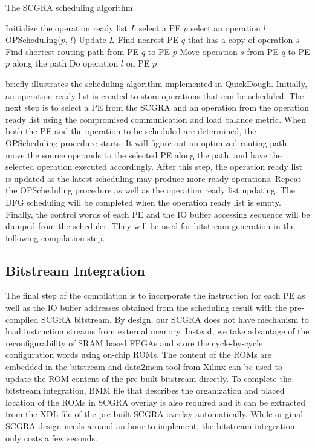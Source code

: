 \begin{algorithm}
\caption{The SCGRA scheduling algorithm.}
\label{alg:scheduling}
\begin{algorithmic}
\STATE Initialize the operation ready list $L$
\STATE select a PE $p$
\STATE select an operation $l$
\STATE OPScheduling($p$, $l$)
\STATE Update $L$
\ENDWHILE
\ENDPROCEDURE
\STATE
{}
\STATE Find nearest PE $q$ that has a copy of operation $s$
\STATE Find shortest routing path from PE $q$ to PE $p$
\STATE Move operation $s$ from PE $q$ to PE $p$ along the path
\ENDFOR
\STATE Do operation $l$ on PE $p$
\ENDPROCEDURE

\end{algorithmic}
\end{algorithm}

 briefly illustrates the scheduling algorithm implemented in QuickDough. Initially, an operation ready list is created to store operations that can be scheduled. The next step is to select a PE from the SCGRA and an operation from the operation ready list using the compromised communication and load balance metric. When both the PE and the operation to be scheduled are determined, the OPScheduling procedure starts. It will figure out an optimized routing path, move the source operands to the selected PE along the path, and have the selected operation executed accordingly. After this step, the operation ready list is updated as the latest scheduling may produce more ready operations. Repeat the OPScheduling procedure as well as the operation ready list updating. The DFG scheduling will be completed when the operation ready list is empty. Finally, the control words of each PE and the IO buffer accessing sequence will be dumped from the scheduler. They will be used for bitstream generation in the following compilation step. 

\subsection{Bitstream Integration}
The final step of the compilation is to incorporate the instruction for each PE as well as the IO buffer addresses obtained from the scheduling result with the pre-compiled SCGRA bitstream. By design, our SCGRA does not have mechanism to load instruction streams from external memory. Instead, we take advantage of the reconfigurability of SRAM based FPGAs and store the cycle-by-cycle configuration words using on-chip ROMs. The content of the ROMs are embedded in the bitstream and data2mem tool from Xilinx \cite{data2mem} can be used to update the ROM content of the pre-built bitstream directly. To complete the bitstream integration, BMM file that describes the organization and placed location of the ROMs in SCGRA overlay is also required and it can be extracted from the XDL file \cite{beckhoff2011xilinx} of the pre-built SCGRA overlay automatically. While original SCGRA design needs around an hour to implement, the bitstream integration only costs a few seconds.
